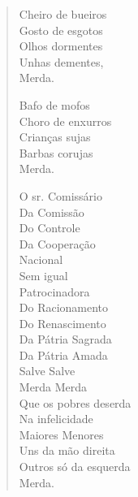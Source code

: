 
\begin{verse}
Cheiro de bueiros\\
Gosto de esgotos\\
Olhos dormentes\\
Unhas dementes,\\
Merda.

Bafo de mofos\\
Choro de enxurros\\
Crianças sujas\\
Barbas corujas\\
Merda.

O sr. Comissário\\
Da Comissão\\
Do Controle\\
Da Cooperação\\
Nacional\\
Sem igual\\
Patrocinadora\\
Do Racionamento\\
Do Renascimento\\
Da Pátria Sagrada\\
Da Pátria Amada\\
Salve Salve\\
Merda Merda\\
Que os pobres deserda\\
Na infelicidade\\
Maiores Menores\\
Uns da mão direita\\
Outros só da esquerda\\
Merda.
\end{verse}

